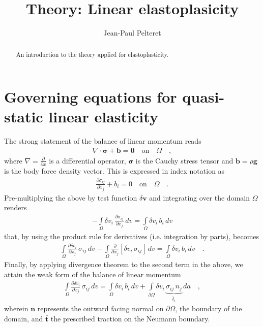 \documentclass[]{scrartcl}
\title{Theory: Linear elastoplasicity}
\author{Jean-Paul Pelteret}
\begin{document}
\maketitle

\begin{abstract}
An introduction to the theory applied for elastoplasticity.
\end{abstract}

\section{Governing equations for quasi-static linear elasticity}
The strong statement of the balance of linear momentum reads
\begin{gather}
\nabla \cdot \boldsymbol{\sigma} + \mathbf{b} 
  = \mathbf{0}
\quad \text{on} \quad \Omega \quad ,
\end{gather}
where $\nabla = \frac{\partial}{\partial x}$ is a differential operator,
$\boldsymbol{\sigma}$ is the Cauchy stress tensor and
$\mathbf{b} = \rho \mathbf{g}$ is the body force density vector.
This is expressed in index notation as
\begin{gather}
\frac{\partial \sigma_{ij}}{\partial x_{j}} + b_{i} 
  = 0
\quad \text{on} \quad \Omega \quad .
\end{gather}
Pre-multiplying the above by test function $\delta \mathbf{v}$ and integrating over the domain $\Omega$ renders
\begin{gather}
- \int\limits_{\Omega} \delta v_{i} \,  \frac{\partial \sigma_{ij}}{\partial x_{j}} \, dv
  = \int\limits_{\Omega} \delta v_{i} \, b_{i} \, dv
\end{gather}
that, by using the product rule for derivatives (i.e. integration by parts), becomes
\begin{gather}
\int\limits_{\Omega} \frac{\partial \delta v_{i}}{\partial x_{j}} \, \sigma_{ij} \, dv
- \int\limits_{\Omega} \frac{\partial}{\partial x_{j}} \left[ \delta v_{i} \, \sigma_{ij} \right] \, dv
  = \int\limits_{\Omega} \delta v_{i} \, b_{i} \, dv
\quad .
\end{gather}
Finally, by applying divergence theorem to the second term in the above, we attain the weak form of the balance of linear momentum
\begin{gather}
\int\limits_{\Omega} \frac{\partial \delta v_{i}}{\partial x_{j}} \, \sigma_{ij} \, dv
  = \int\limits_{\Omega} \delta v_{i} \, b_{i} \, dv
  + \int\limits_{\partial\Omega} \delta v_{i} \, \underbrace{\sigma_{ij} \, n_{j}}_{\bar{t}_{i}} \, da
\quad ,
\label{equ: Weak form of the balance of linear momentum}
\end{gather}
wherein $\mathbf{n}$ represents the outward facing normal on $\partial\Omega$, the boundary of the domain, and $\bar{\mathbf{t}}$ the prescribed traction on the Neumann boundary.
\end{document}
